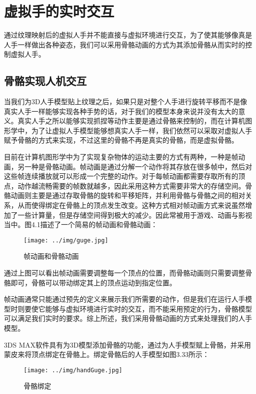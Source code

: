 \chapter{虚拟手的实时交互}
通过纹理映射后的虚拟人手并不能直接与虚拟环境进行交互，为了使其能够像真是人手一样做出各种姿态，我们可以采用骨骼动画的方式为其添加骨骼从而实时的控制虚拟人手。
\section{骨骼实现人机交互}
当我们为3D人手模型贴上纹理之后，如果只是对整个人手进行旋转平移而不是像真实人手一样能够实现各种手势的话，对于我们的模型本身来说并没有太大的意义。真实人手之所以能够实现抓捏等动作主要是通过骨骼来控制的，而在计算机图形学中，为了让虚拟人手模型能够想真实人手一样，我们依然可以采取对虚拟人手赋予骨骼的方式来实现，不过这里的骨骼不再是真实的骨骼，而是虚拟骨骼。

目前在计算机图形学中为了实现复杂物体的运动主要的方式有两种，一种是帧动画，另一种是骨骼动画。帧动画是通过分解一个动作将其存放在很多帧中，然后对这些帧连续播放就可以形成一个完整的动作。对于每帧动画都需要存取所有的顶点，动作越流畅需要的帧数就越多，因此采用这种方式需要非常大的存储空间。骨骼动画则主要是通过存取骨骼的旋转和平移矩阵，并利用骨骼与骨骼之间的相对关系，从而使得绑定在骨骼上的顶点发生改变。这种方式相对帧动画方式来说虽然增加了一些计算量，但是存储空间得到极大的减少。因此常被用于游戏、动画与影视当中。图4.1描述了一个简易的帧动画和骨骼动画\cite{Pipho02}：

\begin{figure}[htb]
\centering
\texttt{[image: ../img/guge.jpg]}
\caption{帧动画和骨骼动画}
\label{fig：graph}
\end{figure} 

通过上图可以看出帧动画需要调整每一个顶点的位置，而骨骼动画则只需要调整骨骼即可，骨骼可以带动绑定其上的顶点运动到指定位置。

帧动画通常只能通过预先的定义来展示我们所需要的动作，但是我们在运行人手模型时则要使它能够与虚拟环境进行实时的交互，而不能采用预定的行为，骨骼模型可以满足我们实时的要求。综上所述，我们采用骨骼动画的方式来处理我们的人手模型。

3DS
MAX软件具有为3D模型添加骨骼的功能，通过为人手模型赋上骨骼，并采用蒙皮来将顶点绑定在骨骼上。绑定骨骼后的人手模型如图3.33所示：

\begin{figure}[htb]
\centering
\texttt{[image: ../img/handGuge.jpg]}
\caption{骨骼绑定}
\label{fig：graph}
\end{figure} 

